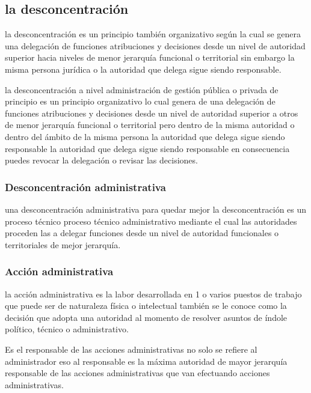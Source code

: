 \documentclass[
  a4paper,
]{article}
\begin{document}
\hypertarget{la-desconcentraciuxf3n}{%
\subsection{la desconcentración}\label{la-desconcentraciuxf3n}}

la desconcentración es un principio también organizativo según la cual
se genera una delegación de funciones atribuciones y decisiones desde un
nivel de autoridad superior hacia niveles de menor jerarquía funcional o
territorial sin embargo la misma persona jurídica o la autoridad que
delega sigue siendo responsable.

la desconcentración a nivel administración de gestión pública o privada
de principio es un principio organizativo lo cual genera de una
delegación de funciones atribuciones y decisiones desde un nivel de
autoridad superior a otros de menor jerarquía funcional o territorial
pero dentro de la misma autoridad o dentro del ámbito de la misma
persona la autoridad que delega sigue siendo responsable la autoridad
que delega sigue siendo responsable en consecuencia puedes revocar la
delegación o revisar las decisiones.

\hypertarget{desconcentraciuxf3n-administrativa}{%
\subsubsection{Desconcentración
administrativa}\label{desconcentraciuxf3n-administrativa}}

una desconcentración administrativa para quedar mejor la
desconcentración es un proceso técnico proceso técnico administrativo
mediante el cual las autoridades proceden las a delegar funciones desde
un nivel de autoridad funcionales o territoriales de mejor jerarquía.

\hypertarget{acciuxf3n-administrativa}{%
\subsubsection{Acción administrativa}\label{acciuxf3n-administrativa}}

la acción administrativa es la labor desarrollada en 1 o varios puestos
de trabajo que puede ser de naturaleza física o intelectual también se
le conoce como la decisión que adopta una autoridad al momento de
resolver asuntos de índole político, técnico o administrativo.

Es el responsable de las acciones administrativas no solo se refiere al
administrador eso al responsable es la máxima autoridad de mayor
jerarquía responsable de las acciones administrativas que van efectuando
acciones administrativas.
\end{document}
